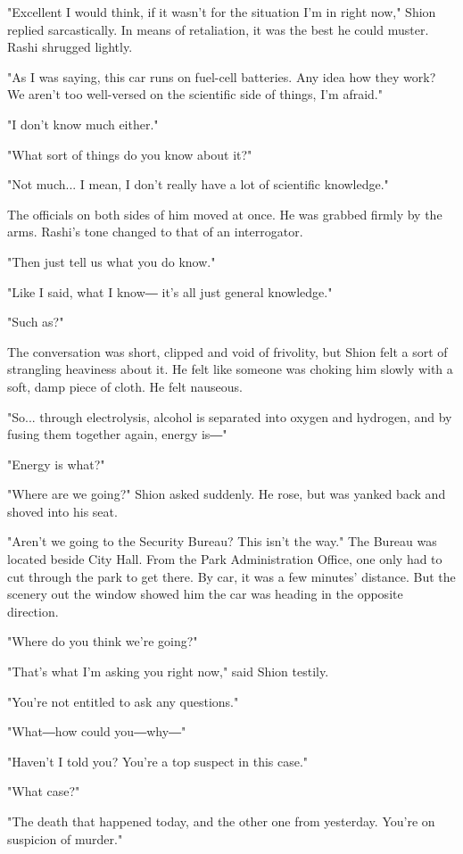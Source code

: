 "Excellent I would think, if it wasn't for the situation I'm in right
now," Shion replied sarcastically. In means of retaliation, it was the
best he could muster. Rashi shrugged lightly.

"As I was saying, this car runs on fuel-cell batteries. Any idea how
they work? We aren't too well-versed on the scientific side of things,
I'm afraid."

"I don't know much either."

"What sort of things do you know about it?"

"Not much... I mean, I don't really have a lot of scientific knowledge."

The officials on both sides of him moved at once. He was grabbed firmly
by the arms. Rashi's tone changed to that of an interrogator.

"Then just tell us what you do know."

"Like I said, what I know― it's all just general knowledge."

"Such as?"

The conversation was short, clipped and void of frivolity, but Shion
felt a sort of strangling heaviness about it. He felt like someone was
choking him slowly with a soft, damp piece of cloth. He felt nauseous.

"So... through electrolysis, alcohol is separated into oxygen and
hydrogen, and by fusing them together again, energy is―"

"Energy is what?"

"Where are we going?" Shion asked suddenly. He rose, but was yanked back
and shoved into his seat.

"Aren't we going to the Security Bureau? This isn't the way." The Bureau
was located beside City Hall. From the Park Administration Office, one
only had to cut through the park to get there. By car, it was a few
minutes' distance. But the scenery out the window showed him the car was
heading in the opposite direction.

"Where do you think we're going?"

"That's what I'm asking you right now," said Shion testily.

"You're not entitled to ask any questions."

"What―how could you―why―"

"Haven't I told you? You're a top suspect in this case."

"What case?"

"The death that happened today, and the other one from yesterday. You're
on suspicion of murder."

